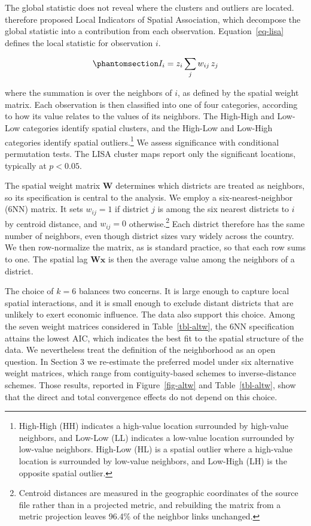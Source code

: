 \documentclass[
  a4paper, 
  twoside,
  final
]{article}
\begin{document}
The global statistic does not reveal where the clusters and outliers are
located. \citet{anselin_lisa} therefore proposed Local Indicators of
Spatial Association, which decompose the global statistic into a
contribution from each observation. Equation~\ref{eq-lisa} defines the
local statistic for observation \(i\).

\begin{equation}\phantomsection\label{eq-lisa}{
I_i = z_i \sum_j w_{ij} \, z_j
}\end{equation}

where the summation is over the neighbors of \(i\), as defined by the
spatial weight matrix. Each observation is then classified into one of
four categories, according to how its value relates to the values of its
neighbors. The High-High and Low-Low categories identify spatial
clusters, and the High-Low and Low-High categories identify spatial
outliers.\footnote{High-High (HH) indicates a high-value location
  surrounded by high-value neighbors, and Low-Low (LL) indicates a
  low-value location surrounded by low-value neighbors. High-Low (HL) is
  a spatial outlier where a high-value location is surrounded by
  low-value neighbors, and Low-High (LH) is the opposite spatial
  outlier.} We assess significance with conditional permutation tests.
The LISA cluster maps report only the significant locations, typically
at \(p < 0.05\).

The spatial weight matrix \(\mathbf{W}\) determines which districts are
treated as neighbors, so its specification is central to the analysis.
We employ a six-nearest-neighbor (6NN) matrix. It sets \(w_{ij} = 1\) if
district \(j\) is among the six nearest districts to \(i\) by centroid
distance, and \(w_{ij} = 0\) otherwise.\footnote{Centroid distances are
  measured in the geographic coordinates of the source file rather than
  in a projected metric, and rebuilding the matrix from a metric
  projection leaves 96.4\% of the neighbor links unchanged.} Each
district therefore has the same number of neighbors, even though
district sizes vary widely across the country. We then row-normalize the
matrix, as is standard practice, so that each row sums to one. The
spatial lag \(\mathbf{W} \mathbf{x}\) is then the average value among
the neighbors of a district.

The choice of \(k = 6\) balances two concerns. It is large enough to
capture local spatial interactions, and it is small enough to exclude
distant districts that are unlikely to exert economic influence. The
data also support this choice. Among the seven weight matrices
considered in Table~\ref{tbl-altw}, the 6NN specification attains the
lowest AIC, which indicates the best fit to the spatial structure of the
data. We nevertheless treat the definition of the neighborhood as an
open question. In Section 3 we re-estimate the preferred model under six
alternative weight matrices, which range from contiguity-based schemes
to inverse-distance schemes. Those results, reported in
Figure~\ref{fig-altw} and Table~\ref{tbl-altw}, show that the direct and
total convergence effects do not depend on this choice.
\end{document}
